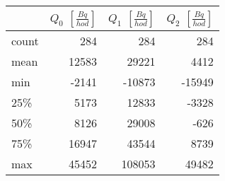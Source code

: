 \begin{tabular}{lrrr}
\toprule
{} &  $Q_0$ $\left[\si{\frac{Bq}{hod}}\right]$ &  $Q_1$ $\left[\si{\frac{Bq}{hod}}\right]$ &  $Q_2$ $\left[\si{\frac{Bq}{hod}}\right]$ \\
\midrule
count &                                       284 &                                       284 &                                       284 \\
mean  &                                     12583 &                                     29221 &                                      4412 \\
min   &                                     -2141 &                                    -10873 &                                    -15949 \\
25\%   &                                      5173 &                                     12833 &                                     -3328 \\
50\%   &                                      8126 &                                     29008 &                                      -626 \\
75\%   &                                     16947 &                                     43544 &                                      8739 \\
max   &                                     45452 &                                    108053 &                                     49482 \\
\bottomrule
\end{tabular}
